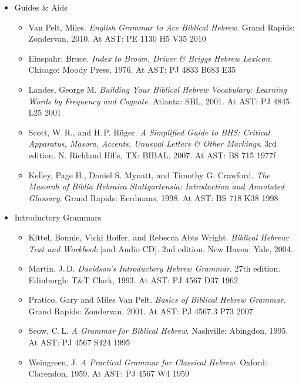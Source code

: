 \documentclass[titlepage]{article}
\begin{document}
\begin{itemize}
  \item Guides \& Aids

    \begin{itemize}
      \item
        Van Pelt, Miles. \emph{English Grammar to Ace Biblical Hebrew}.
        Grand Rapids: Zondervan, 2010. At AST: PE 1130 H5 V35 2010
      \item
        Einspahr, Bruce. \emph{Index to Brown, Driver \& Briggs Hebrew Lexicon}.
        Chicago: Moody Press, 1976. At AST: PJ 4833 B683 E35
      \item
        Landes, George M. \emph{Building Your Biblical Hebrew
        Vocabulary: Learning Words by Frequency and Cognate}.
        Atlanta: SBL, 2001. At AST: PJ 4845 L25 2001
      \item
        Scott, W.\,R., and H.\,P. Rüger. \emph{A Simplified Guide to BHS:
        Critical Apparatus, Masora, Accents, Unusual Letters \& Other
        Markings}. 3rd edition. N. Richland Hills, TX: BIBAL, 2007.
        At AST: BS 715 1977f
      \item
        Kelley, Page H., Daniel S. Mynatt, and Timothy G. Crawford.
        \emph{The Masorah of Biblia Hebraica Stuttgartensia:
        Introduction and Annotated Glossary}.
        Grand Rapids: Eerdmans, 1998. At AST: BS 718 K38 1998
    \end{itemize}

  \item Introductory Grammars

    \begin{itemize}
      \item
        Kittel, Bonnie, Vicki Hoffer, and Rebecca Abts Wright.
        \emph{Biblical Hebrew: Text and Workbook} [and Audio CD].
        2nd edition. New Haven: Yale, 2004.
      \item
        Martin, J.\,D. \emph{Davidson’s Introductory Hebrew Grammar}.
        27th edition. Edinburgh: T\&T Clark, 1993. At AST: PJ 4567 D37 1962
      \item
        Pratico, Gary and Miles Van Pelt. \emph{Basics of Biblical Hebrew Grammar}.
        Grand Rapids: Zondervan, 2001. At AST: PJ 4567.3 P73 2007
      \item
        Seow, C.\,L. \emph{A Grammar for Biblical Hebrew}.
        Nashville: Abingdon, 1995. At AST: PJ 4567 S424 1995
      \item
        Weingreen, J. \emph{A Practical Grammar for Classical Hebrew}.
        Oxford: Clarendon, 1959. At AST: PJ 4567 W4 1959
    \end{itemize}



\end{itemize}
\end{document}
